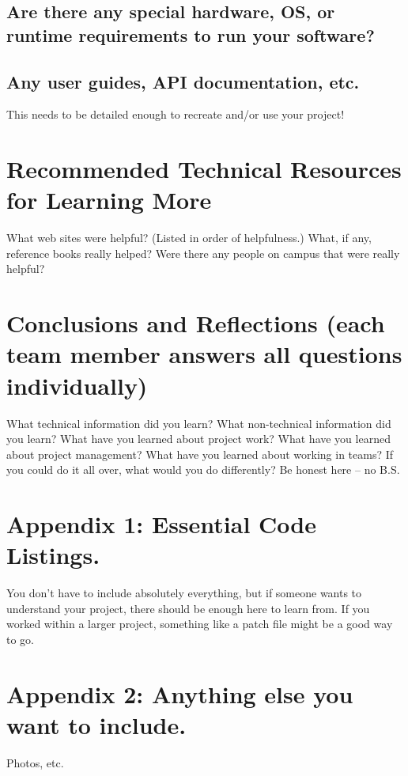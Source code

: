\documentclass[journal,10pt,onecolumn,compsoc]{IEEEtran}
\begin{document}
\subsection{Are there any special hardware, OS, or runtime requirements to run your software?}
\subsection{Any user guides, API documentation, etc.}
This needs to be detailed enough to recreate and/or use your project!
\section{Recommended Technical Resources for Learning More}
What web sites were helpful? (Listed in order of helpfulness.)
What, if any, reference books really helped?
Were there any people on campus that were really helpful?
\section{Conclusions and Reflections (each team member answers all questions individually)}
What technical information did you learn?
What non-technical information did you learn?
What have you learned about project work?
What have you learned about project management?
What have you learned about working in teams?
If you could do it all over, what would you do differently?
Be honest here -- no B.S.

\section{Appendix 1: Essential Code Listings.}
You don't have to include absolutely everything, but if someone wants to understand your project, there should be enough here to learn from. If you worked within a larger project, something like a patch file might be a good way to go.
\section{Appendix 2: Anything else you want to include.}
Photos, etc.




\end{document}
